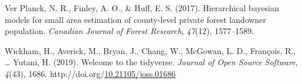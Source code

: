 \documentclass[12pt,twoside]{reedthesis}
\newlength{\cslhangindent}
\newenvironment{CSLReferences}[2] %
 {%
  \setlength{\parindent}{0pt}
  \ifodd #1 \everypar{\setlength{\hangindent}{\cslhangindent}}\ignorespaces\fi
  \ifnum #2 > 0
  \setlength{\parskip}{#2\baselineskip}
  \fi
 }%
 {}
\begin{document}
\begin{CSLReferences}{1}{0}
\leavevmode{}%
Ver Planck, N. R., Finley, A. O., \& Huff, E. S. (2017). Hierarchical bayesian models for small area estimation of county-level private forest landowner population. \emph{Canadian Journal of Forest Research}, \emph{47}(12), 1577--1589.

\leavevmode{}%
Wickham, H., Averick, M., Bryan, J., Chang, W., McGowan, L. D., François, R., \ldots{} Yutani, H. (2019). Welcome to the {tidyverse}. \emph{Journal of Open Source Software}, \emph{4}(43), 1686. http://doi.org/\href{https://doi.org/10.21105/joss.01686}{10.21105/joss.01686}

\end{CSLReferences}

\end{document}
